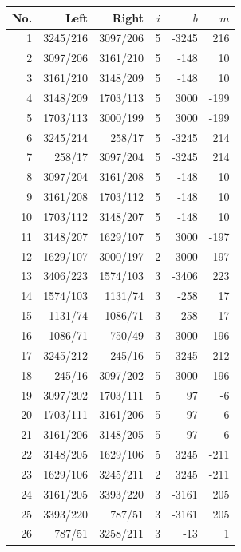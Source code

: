 \documentclass[11pt,a4paper]{article}
\begin{document}
\par\vspace{4pt}
\noindent\begin{minipage}[t]{.49\linewidth}\centering\footnotesize\setlength{\tabcolsep}{2pt}\renewcommand{\arraystretch}{1.09}
\begin{tabular*}{\linewidth}{@{}r@{\extracolsep{\fill}}rrrrr@{}}\toprule
No. & Left & Right & $i$ & $b$ & $m$\\\midrule
1 & 3245/216 & 3097/206 & 5 & -3245 & 216\\
2 & 3097/206 & 3161/210 & 5 & -148 & 10\\
3 & 3161/210 & 3148/209 & 5 & -148 & 10\\
4 & 3148/209 & 1703/113 & 5 & 3000 & -199\\
5 & 1703/113 & 3000/199 & 5 & 3000 & -199\\
6 & 3245/214 & 258/17 & 5 & -3245 & 214\\
7 & 258/17 & 3097/204 & 5 & -3245 & 214\\
8 & 3097/204 & 3161/208 & 5 & -148 & 10\\
9 & 3161/208 & 1703/112 & 5 & -148 & 10\\
10 & 1703/112 & 3148/207 & 5 & -148 & 10\\
11 & 3148/207 & 1629/107 & 5 & 3000 & -197\\
12 & 1629/107 & 3000/197 & 2 & 3000 & -197\\
13 & 3406/223 & 1574/103 & 3 & -3406 & 223\\
14 & 1574/103 & 1131/74 & 3 & -258 & 17\\
15 & 1131/74 & 1086/71 & 3 & -258 & 17\\
16 & 1086/71 & 750/49 & 3 & 3000 & -196\\
17 & 3245/212 & 245/16 & 5 & -3245 & 212\\
18 & 245/16 & 3097/202 & 5 & -3000 & 196\\
19 & 3097/202 & 1703/111 & 5 & 97 & -6\\
20 & 1703/111 & 3161/206 & 5 & 97 & -6\\
21 & 3161/206 & 3148/205 & 5 & 97 & -6\\
22 & 3148/205 & 1629/106 & 5 & 3245 & -211\\
23 & 1629/106 & 3245/211 & 2 & 3245 & -211\\
24 & 3161/205 & 3393/220 & 3 & -3161 & 205\\
25 & 3393/220 & 787/51 & 3 & -3161 & 205\\
26 & 787/51 & 3258/211 & 3 & -13 & 1\\

\end{tabular*}
\end{minipage}
\end{document}
